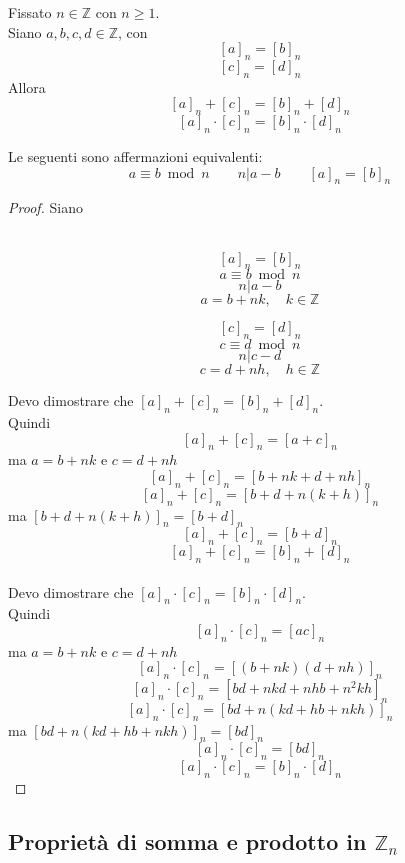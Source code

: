 \documentclass[a4paper,12pt, oneside]{book}
\begin{document}
\begin{teorema}
	Fissato $n \in \mathbb{Z}$ con $n \geq 1$.\\
	Siano $a,b,c,d \in \mathbb{Z}$, con $$[a]_n = [b]_n$$ $$[c]_n = [d]_n$$
	Allora
	$$[a]_n + [c]_n = [b]_n + [d]_n$$
	$$[a]_n \cdot [c]_n = [b]_n \cdot [d]_n$$

	\begin{nota}
		Le seguenti sono affermazioni equivalenti:
		$$a \equiv b \bmod n \qquad n | a-b \qquad [a]_n = [b]_n$$
	\end{nota}

	\begin{proof}
		Siano\\\\
		\begin{minipage}{0.45\textwidth}
			$$[a]_n = [b]_n$$
			$$a \equiv b \bmod n$$
			$$n|a-b$$
			$$a = b+nk, \quad k\in \mathbb{Z}$$
		\end{minipage}%
		\hfill
		\begin{minipage}{0.45\textwidth}
			$$[c]_n = [d]_n$$
			$$c \equiv d \bmod n$$
			$$n|c-d$$
			$$c = d+nh, \quad h\in \mathbb{Z}$$
		\end{minipage}%

		Devo dimostrare che $[a]_n + [c]_n = [b]_n + [d]_n$.\\
		Quindi
		$$[a]_n + [c]_n = [a+c]_n$$
		ma $a = b+nk$ e $c=d+nh$
		$$[a]_n + [c]_n = [b+nk+d+nh]_n$$
		$$[a]_n + [c]_n = [b+d+n(k+h)]_n$$
		ma $[b+d+n(k+h)]_n = [b+d]_n$
		$$[a]_n + [c]_n = [b+d]_n$$
		$$[a]_n + [c]_n = [b]_n + [d]_n$$\\

		Devo dimostrare che $[a]_n \cdot [c]_n = [b]_n \cdot [d]_n$.\\
		Quindi
		$$[a]_n \cdot [c]_n = [ac]_n$$
		ma $a = b+nk$ e $c=d+nh$
		$$[a]_n \cdot [c]_n = [(b+nk)(d+nh)]_n$$
		$$[a]_n \cdot [c]_n = [bd+nkd+nhb+n^2kh]_n$$
		$$[a]_n \cdot [c]_n = [bd+n(kd+hb+nkh)]_n$$
		ma $[bd+n(kd+hb+nkh)]_n = [bd]_n$
		$$[a]_n \cdot [c]_n = [bd]_n$$
		$$[a]_n \cdot [c]_n = [b]_n \cdot [d]_n$$
	\end{proof}
\end{teorema}

\subsection{Proprietà di somma e prodotto in $\mathbb{Z}_n$}
\end{document}

